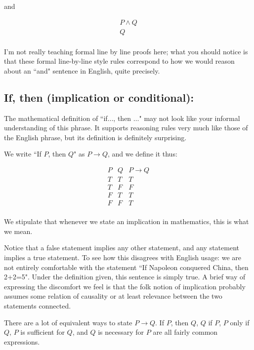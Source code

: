 \documentclass[12pt]{article}
\begin{document}
and 

$$\begin{array}{c}

P \wedge Q \\ \hline

Q  \\
\end{array}$$

I'm not really teaching formal line by line proofs here;  what you should notice is that these formal line-by-line style rules correspond to how we would reason about an ``and" sentence in English, quite precisely.

\newpage

\subsection{If, then (implication or conditional):}

The mathematical definition of ``if$\dots$, then $\ldots$" may not look like your informal understanding of this phrase.
It supports reasoning rules very much like those of the English phrase, but its definition is definitely surprising.

We write ``If $P$, then $Q$" as $P \rightarrow Q$, and we define it thus:

$$\begin{array}{cc|c}
P & Q & P \rightarrow Q \\ \hline
T & T & T \\
T & F & F \\
F & T & T \\
F & F & T \\
\end{array}$$

We stipulate that whenever we state an implication in mathematics, this is what we mean.

Notice that a false statement implies any other statement, and any statement implies a true statement.  To see how this disagrees with English usage:  we are not entirely comfortable with the statement ``If Napoleon conquered China, then 2+2=5".  Under the definition given, this sentence is simply true.  A brief way of expressing the discomfort we feel is that the folk notion of implication probably assumes some relation of causality or at least relevance between the two statements connected.

There are a lot of equivalent ways to state $P \rightarrow Q$.  If $P$, then $Q$, $Q$ if $P$, $P$ only if $Q$, $P$ is sufficient for $Q$, and $Q$ is necessary for $P$ are all fairly common expressions.
\end{document}
